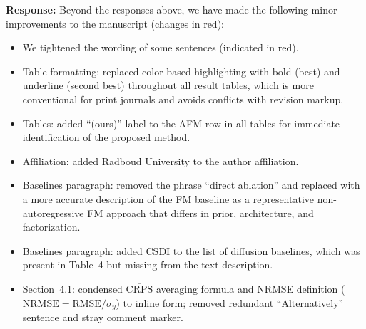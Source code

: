 \documentclass[11pt]{article}
\newcommand{\authorresponse}[1]{%
  \textbf{Response:} #1\par\medskip
}
\begin{document}
\authorresponse{%
Beyond the responses above, we have made the following minor improvements to the manuscript (changes in red):
\begin{itemize}[nosep]
\item We tightened the wording of some sentences (indicated in red).
  \item Table formatting: replaced color-based highlighting with bold (best) and underline (second best) throughout all result tables, which is more conventional for print journals and avoids conflicts with revision markup.
  \item Tables: added ``(ours)'' label to the AFM row in all tables for immediate identification of the proposed method.
  \item Affiliation: added Radboud University to the author affiliation.
  \item Baselines paragraph: removed the phrase ``direct ablation'' and replaced with a more accurate description of the FM baseline as a representative non-autoregressive FM approach that differs in prior, architecture, and factorization.
  \item Baselines paragraph: added CSDI to the list of diffusion baselines, which was present in Table~4 but missing from the text description.
  \item Section~4.1: condensed $\overline{\text{CRPS}}$ averaging formula and NRMSE definition ($\text{NRMSE} = \text{RMSE}/\sigma_y$) to inline form; removed redundant ``Alternatively'' sentence and stray comment marker.
\end{itemize}
}



\end{document}
